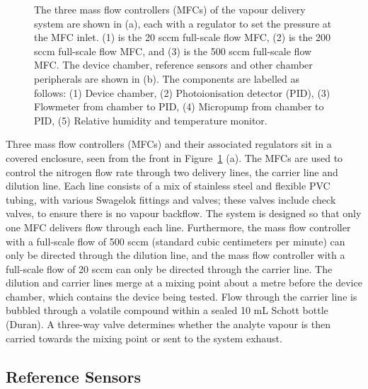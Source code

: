 \documentclass[
  a4paper,
]{scrbook}
\begin{document}
\begin{figure}
\caption[Layout of the vapour delivery system, showing the three mass
flow controllers (MFCs), the device chamber, photoionisation detector
(PID), PID flowmeter, PID micropump and relative temperature and
humidity monitor (RHI).]{\label{fig-delivery-system}The three mass flow
controllers (MFCs) of the vapour delivery system are shown in (a), each
with a regulator to set the pressure at the MFC inlet. (1) is the 20
sccm full-scale flow MFC, (2) is the 200 sccm full-scale flow MFC, and
(3) is the 500 sccm full-scale flow MFC. The device chamber, reference
sensors and other chamber peripherals are shown in (b). The components
are labelled as follows: (1) Device chamber, (2) Photoionisation
detector (PID), (3) Flowmeter from chamber to PID, (4) Micropump from
chamber to PID, (5) Relative humidity and temperature monitor.}

\end{figure}

Three mass flow controllers (MFCs) and their associated regulators sit
in a covered enclosure, seen from the front in
Figure~\ref{fig-delivery-system} (a). The MFCs are used to control the
nitrogen flow rate through two delivery lines, the carrier line and
dilution line. Each line consists of a mix of stainless steel and
flexible PVC tubing, with various Swagelok fittings and valves; these
valves include check valves, to ensure there is no vapour backflow. The
system is designed so that only one MFC delivers flow through each line.
Furthermore, the mass flow controller with a full-scale flow of 500 sccm
(standard cubic centimeters per minute) can only be directed through the
dilution line, and the mass flow controller with a full-scale flow of 20
sccm can only be directed through the carrier line. The dilution and
carrier lines merge at a mixing point about a metre before the device
chamber, which contains the device being tested. Flow through the
carrier line is bubbled through a volatile compound within a sealed 10
mL Schott bottle (Duran). A three-way valve determines whether the
analyte vapour is then carried towards the mixing point or sent to the
system exhaust.

\hypertarget{sec-reference-sensors}{%
\subsection{Reference Sensors}\label{sec-reference-sensors}}
\end{document}
